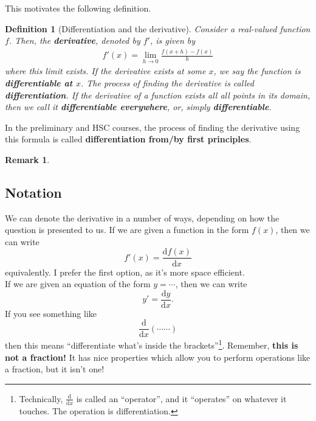 \documentclass[a4paper,11pt]{article}
\newcommand{\diff}[2]{\frac{\mathrm{d}#1}{\mathrm{d}#2}}
\newtheorem*{definition*}{Definition}
\newtheorem*{remark}{Remark}
\begin{document}
	This motivates the following definition.
	\begin{definition*}[Differentiation and the derivative]
		Consider a real-valued function $f$. Then, the \textbf{derivative}, denoted by $f'$, is given by 
		\begin{align*}
		f'(x) = \lim\limits_{h\to 0}\frac{f(x+h)-f(x)}{h}
		\end{align*}
		where this limit exists. If the derivative exists at some $x$, we say the function is \textbf{differentiable at $x$}. The process of finding the derivative is called \textbf{differentiation}. If the derivative of a function exists all all points in its domain, then we call it \textbf{differentiable everywhere}, or, simply \textbf{differentiable}.
	\end{definition*}

	\noindent In the preliminary and HSC courses, the process of finding the derivative using this formula is called \textbf{differentiation from/by first principles}.

	\begin{remark}
	\end{remark}
	
	\pagebreak
	\subsection*{Notation}
	We can denote the derivative in a number of ways, depending on how the question is presented to us. If we are given a function in the form $f(x)$, then we can write
	$$
	f'(x) =  \diff{f(x)}{x}
	$$
	equivalently. I prefer the first option, as it's more space efficient.\\
	
	\noindent If we are given an equation of the form $y=\cdots$, then we can write
	$$
	y' = \diff{y}{x}.
	$$
	If you see something like 
	$$
	\diff{}{x}\left(\cdots\cdots\right)
	$$
	then this means ``differentiate what's inside the brackets''\footnote{Technically, $\diff{}{x}$ is called an ``operator'', and it ``operates'' on whatever it touches. The operation is differentiation.}. Remember, \textbf{this is not a fraction!} It has nice properties which allow you to perform operations like a fraction, but it isn't one!
	
\end{document}
